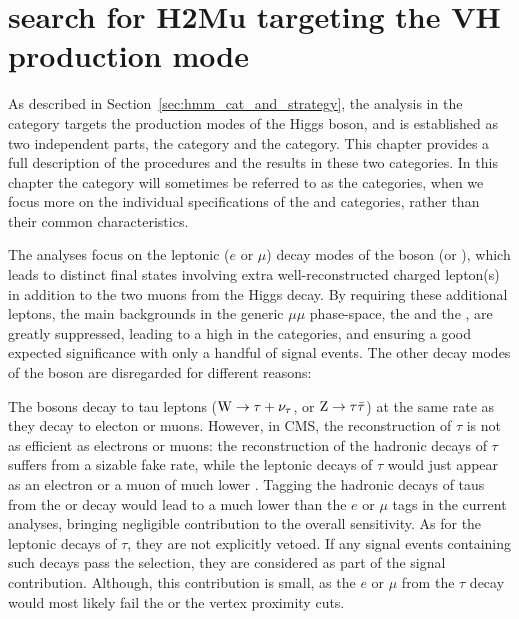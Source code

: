 \chapter{search for H2Mu targeting the VH production mode}

As described in Section~\ref{sec:hmm_cat_and_strategy}, the analysis in the \VH category targets the \VH production modes of the Higgs boson, 
and is established as two independent parts, the \WH category and the \ZH category.
This chapter provides a full description of the procedures and the results in these two categories.
In this chapter the \VH category will sometimes be referred to as the \VH categories, 
when we focus more on the individual specifications of the \WH and \ZH categories, rather than their common characteristics.

The \VH analyses focus on the leptonic ($e$ or $\mu$) decay modes of the \PV boson (\PW or \PZ), 
which leads to distinct final states involving extra well-reconstructed charged lepton(s) in addition to the two muons from the Higgs decay.
By requiring these additional leptons, the main backgrounds in the generic $\mu\mu$ phase-space, the \DY and the \ttbar, are greatly suppressed,
leading to a high \SoB in the \VH categories, and ensuring a good expected significance with only a handful of signal events.
The other decay modes of the \PV boson are disregarded for different reasons:

The \PV bosons decay to tau leptons ($\mathrm{W} \to \tau+\nu_{\tau}$, or $\mathrm{Z} \to \tau\bar{\tau}$) at the same rate as they decay to electon or muons. 
However, in CMS, the reconstruction of $\tau$ is not as efficient as electrons or muons: 
the reconstruction of the hadronic decays of $\tau$ suffers from a sizable fake rate, 
while the leptonic decays of $\tau$ would just appear as an electron or a muon of much lower \pt.
Tagging the hadronic decays of taus from the \PW or \PZ decay would lead to a much lower \SoB than the $e$ or $\mu$ tags in the current \VH analyses,
bringing negligible contribution to the overall sensitivity.
As for the leptonic decays of $\tau$, they are not explicitly vetoed.
If any \VH signal events containing such decays pass the selection, they are considered as part of the signal contribution.
Although, this contribution is small, as the $e$ or $\mu$ from the $\tau$ decay would most likely fail the \pt or the vertex proximity cuts.

